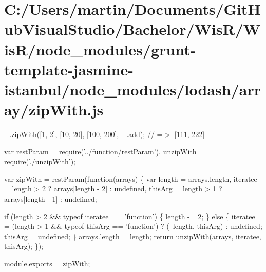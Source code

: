 \hypertarget{_c_1_2_users_2martin_2_documents_2_git_hub_visual_studio_2_bachelor_2_wis_r_2_wis_r_2node_modulee9eb2b8afccfb20541bd610ebce5c67e}{}\section{C\+:/\+Users/martin/\+Documents/\+Git\+Hub\+Visual\+Studio/\+Bachelor/\+Wis\+R/\+Wis\+R/node\+\_\+modules/grunt-\/template-\/jasmine-\/istanbul/node\+\_\+modules/lodash/array/zip\+With.\+js}
\+\_\+.\+zip\+With(\mbox{[}1, 2\mbox{]}, \mbox{[}10, 20\mbox{]}, \mbox{[}100, 200\mbox{]}, \+\_\+.\+add); // =$>$ \mbox{[}111, 222\mbox{]}


\begin{DoxyCodeInclude}
var restParam = require(\textcolor{stringliteral}{'../function/restParam'}),
    unzipWith = require(\textcolor{stringliteral}{'./unzipWith'});

var zipWith = restParam(\textcolor{keyword}{function}(arrays) \{
  var length = arrays.length,
      iteratee = length > 2 ? arrays[length - 2] : undefined,
      thisArg = length > 1 ? arrays[length - 1] : undefined;

  \textcolor{keywordflow}{if} (length > 2 && typeof iteratee == \textcolor{stringliteral}{'function'}) \{
    length -= 2;
  \} \textcolor{keywordflow}{else} \{
    iteratee = (length > 1 && typeof thisArg == \textcolor{stringliteral}{'function'}) ? (--length, thisArg) : undefined;
    thisArg = undefined;
  \}
  arrays.length = length;
  \textcolor{keywordflow}{return} unzipWith(arrays, iteratee, thisArg);
\});

module.exports = zipWith;
\end{DoxyCodeInclude}
 